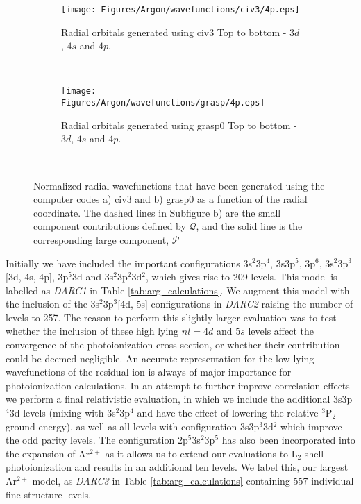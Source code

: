 \begin{figure}
\begin{subfigure}{0.45\textwidth}
        \texttt{[image: Figures/Argon/wavefunctions/civ3/4p.eps]}
        \caption*{Radial orbitals generated using {\sc civ3} Top to bottom - $3d$, $4s$ and $4p$.}
    \end{subfigure}
    ~ %
    \begin{subfigure}{0.45\textwidth}
        \texttt{[image: Figures/Argon/wavefunctions/grasp/4p.eps]}
        \caption*{Radial orbitals generated using {\sc grasp0} Top to bottom - $3d$, $4s$ and $4p$. }
    \end{subfigure}
    ~ %
        \caption{Normalized radial wavefunctions that have been generated using the computer codes a) {\sc civ3} and b) {\sc grasp0} as a function of the radial coordinate. The dashed lines in Subfigure b) are the small component contributions defined by $\mathcal{Q}$, and the solid line is the corresponding large component, $\mathcal{P}$ \label{fig:arg_radial}}
\end{figure}
%

Initially we have included the important configurations 3s$^2$3p$^4$, 3s3p$^5$, 3p$^6$, 3s$^2$3p$^3$[3d, 4s, 4p], 3p$^5$3d and 3s$^2$3p$^2$3d$^2$, which gives rise to 209 levels. This model is labelled as \textit{DARC1} in Table \ref{tab:arg_calculations}. We augment this model with the inclusion of the 3s$^2$3p$^3$[4d, 5s] configurations in \textit{DARC2} raising the number of levels to 257. The reason to perform this slightly larger evaluation was to test whether the inclusion of these high lying $nl= 4d$ and $5s$ levels affect the convergence of the photoionization cross-section, or whether their contribution could be deemed negligible. An accurate representation for the low-lying wavefunctions of the residual ion is always of major importance for photoionization calculations. In an attempt to further improve correlation effects we perform a final relativistic evaluation, in which we include the additional 3s3p$^4$3d levels (mixing with 3s$^2$3p$^4$ and have the effect of lowering the relative $^3$P$_2$ ground energy), as well as all levels with configuration 3s3p$^3$3d$^2$ which improve the odd parity levels. The configuration 2p$^5$3s$^2$3p$^5$ has also been incorporated into the expansion of Ar$^{2+}$ as it allows us to extend our evaluations to L$_{2}$-shell photoionization and results in an additional ten levels. We label this, our largest Ar$^{2+}$ model, as \textit{DARC3} in Table \ref{tab:arg_calculations} containing 557 individual fine-structure levels.\\ 

